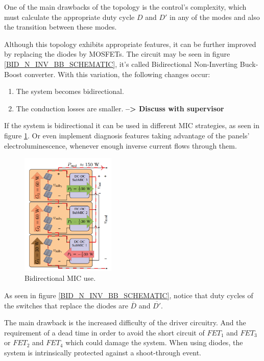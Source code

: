 One of the main drawbacks of the topology is the control's complexity, which must calculate the appropriate duty cycle $D$ and $D'$ in any of the modes and also the transition between these modes. 
		
Although this topology exhibits appropriate features, it can be further improved by replacing the diodes by MOSFETs. The circuit may be seen in figure \ref{BID_N_INV_BB_SCHEMATIC}, it's called Bidirectional Non-Inverting Buck-Boost converter. With this variation, the following changes occur:
		
\begin{enumerate}
	\item The system becomes bidirectional.
	\item The conduction losses are smaller. \textbf{--> Discuss with supervisor}
\end{enumerate}
	
If the system is bidirectional it can be used in different MIC strategies, as seen in figure \ref{BID_MIC_ARCHITECTURES}. Or even implement diagnosis features taking advantage of the panels' electroluminescence, whenever enough inverse current flows through them. 

\begin{figure}[htbp]
	\begin{center}
		\includegraphics[width=0.4\textwidth]{../Pictures/bidirectional_mic_use}
		\caption{Bidirectional MIC use\cite{ArchitectureMIC}.}
		\label{BID_MIC_ARCHITECTURES}
	\end{center}	
\end{figure}
		
		
As seen in figure \ref{BID_N_INV_BB_SCHEMATIC}, notice that duty cycles of the switches that replace the diodes are $\overline{D}$ and $\overline{D'}$.
		
The main drawback is the increased difficulty of the driver circuitry. And the requirement of a dead time in order to avoid the short circuit of $FET_1$ and $FET_3$ or $FET_2$ and $FET_4$ which could damage the system. When using diodes, the system is intrinsically protected against a shoot-through event. 	
		
